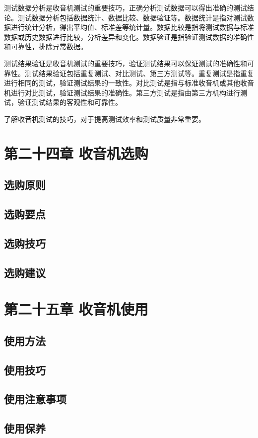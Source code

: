 \documentclass[12pt,UTF8]{ctexbook}
\begin{document}
测试数据分析是收音机测试的重要技巧，正确分析测试数据可以得出准确的测试结论。测试数据分析包括数据统计、数据比较、数据验证等。数据统计是指对测试数据进行统计分析，得出平均值、标准差等统计量。数据比较是指将测试数据与标准数据或历史数据进行比较，分析差异和变化。数据验证是指验证测试数据的准确性和可靠性，排除异常数据。

测试结果验证是收音机测试的重要技巧，验证测试结果可以保证测试的准确性和可靠性。测试结果验证包括重复测试、对比测试、第三方测试等。重复测试是指重复进行相同的测试，验证测试结果的一致性。对比测试是指与标准收音机或其他收音机进行对比测试，验证测试结果的准确性。第三方测试是指由第三方机构进行测试，验证测试结果的客观性和可靠性。

了解收音机测试的技巧，对于提高测试效率和测试质量非常重要。

\chapter{第二十四章 收音机选购}

\section{选购原则}
\section{选购要点}
\section{选购技巧}
\section{选购建议}

\chapter{第二十五章 收音机使用}

\section{使用方法}
\section{使用技巧}
\section{使用注意事项}
\section{使用保养}
\end{document}
